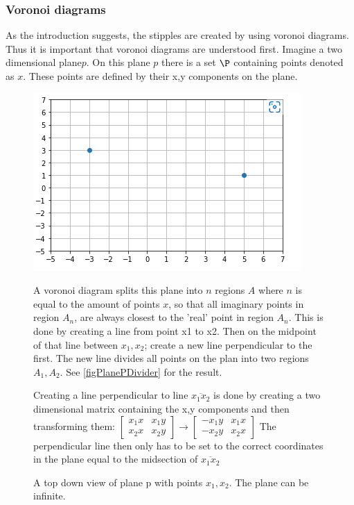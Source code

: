 \subsubsection{Voronoi diagrams}
As the introduction suggests, the stipples are created by using voronoi diagrams. Thus it is important that voronoi diagrams are understood first. Imagine a two dimensional plane\(p\). On this plane \(p\) there is a set \(\P\) containing points denoted as \(x\). These points are defined by their x,y components on the plane. 

\begin{figure}
\centerline{\includegraphics{images/plane_p.png}}
\caption{A top down view of plane p with points \(x_1, x_2\). The plane can be infinite.\newline}
\label{figPlaneP}

 A voronoi diagram splits this plane into \(n\) regions \(A\) where \(n\) is equal to the amount of points \(x\), so that all imaginary points in region \(A_n\), are always closest to the 'real' point in region \(A_n\). This is done by creating a line from point x1 to x2. Then on the midpoint of that line between \(x_1, x_2\); create a new line perpendicular to the first. The new line divides all points on the plan into two regions \(A_1, A_2\). See \ref{figPlanePDivider} for the result.
 
 Creating a line perpendicular to line \(\overline{x_1 x_2}\) is done by creating a two dimensional matrix containing the x,y components and then transforming them:\newline\newline
 \( \begin{bmatrix}x_1x & x_1y\\x_2x & x_2y\end{bmatrix}\rightarrow\begin{bmatrix}-x_1y & x_1x\\-x_2y & x_2x\end{bmatrix}\)\newline\newline
 The perpendicular line then only has to be set to the correct coordinates in the plane equal to the midsection of \(\overline{x_1 x_2}\)


\end{figure}

